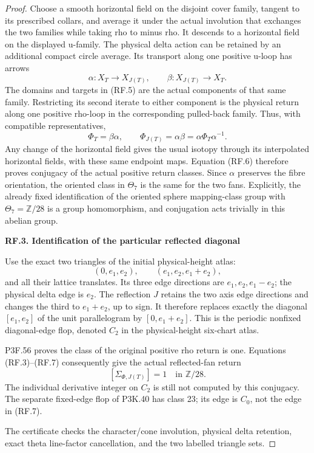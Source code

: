 \begin{proof}
Choose a smooth horizontal field on the disjoint cover family,
tangent to its prescribed collars, and average it under the actual
involution that exchanges the two families while taking rho to minus
rho. It descends to a horizontal field on the displayed u-family.
The physical delta action can be retained by an additional compact
circle average. Its transport along one positive u-loop has arrows
\[
           \alpha:X_T\longrightarrow X_{J(T)},\qquad
           \beta:X_{J(T)}\longrightarrow X_T.
                                                               \tag{RF.5}
\]
The domains and targets in (RF.5) are the actual components of that
same family. Restricting its second iterate to either component is
the physical return along one positive rho-loop in the corresponding
pulled-back family. Thus, with compatible representatives,
\[
                \Phi_T=\beta\alpha,\qquad
                \Phi_{J(T)}=\alpha\beta
                       =\alpha\Phi_T\alpha^{-1}.         \tag{RF.6}
\]
Any change of the horizontal field gives the usual isotopy through
its interpolated horizontal fields, with these same endpoint maps.
Equation (RF.6) therefore proves conjugacy of the actual positive
return classes. Since \(\alpha\) preserves the fibre orientation,
the oriented class in \(\Theta_7\) is the same for the two fans.
Explicitly, the already fixed identification of the oriented sphere
mapping-class group with \(\Theta_7=\mathbb Z/28\) is a group
homomorphism, and conjugation acts trivially in this abelian group.

\par

\medskip\noindent\textbf{RF.3. Identification of the particular reflected diagonal}

\par\nobreak

Use the exact two triangles of the initial physical-height atlas:
\[
       (0,e_1,e_2),\qquad(e_1,e_2,e_1+e_2),
                                                               \tag{RF.7}
\]
and all their lattice translates. Its three edge directions are
\(e_1,e_2,e_1-e_2\); the physical delta edge is \(e_2\).
The reflection \(J\) retains the two axis edge directions and
changes the third to \(e_1+e_2\), up to sign. It therefore replaces
exactly the diagonal \([e_1,e_2]\) of the unit parallelogram by
\([0,e_1+e_2]\). This is the periodic nonfixed diagonal-edge
flop, denoted \(C_2\) in the physical-height six-chart atlas.

P3F.56 proves the class of the original positive rho return is one.
Equations (RF.3)--(RF.7) consequently give the actual reflected-fan
return
\[
                    [\Sigma_{\Phi,J(T)}]=1
                             \quad\text{in }\mathbb Z/28.
                                                               \tag{RF.8}
\]
The individual derivative integer on \(C_2\) is still not computed
by this conjugacy. The separate fixed-edge flop of P3K.40 has class
23; its edge is \(C_0\), not the edge in (RF.7).

The certificate  checks the
character/cone involution, physical delta retention, exact theta
line-factor cancellation, and the two labelled triangle sets.
\end{proof}
